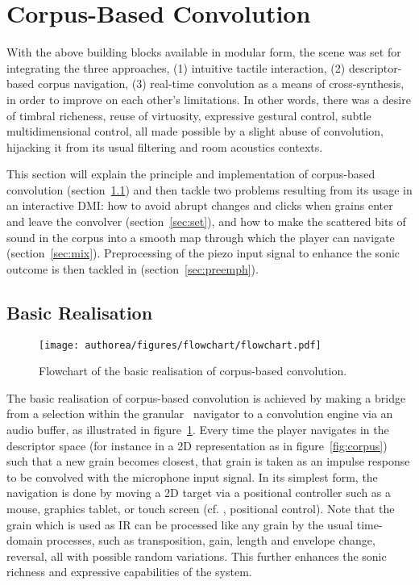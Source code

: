 \section{Corpus-Based Convolution} %

With the above building blocks available in modular form, the scene was set for integrating the three approaches, (1) intuitive tactile interaction, (2) descriptor-based corpus navigation, (3) real-time convolution as a means of cross-\hspace{0pt}synthesis, in order to improve on each other's limitations. In other words, there was a desire of timbral richeness, reuse of virtuosity, expressive gestural control, subtle multidimensional control, all made possible by a slight abuse of convolution, hijacking it from its usual filtering and room acoustics contexts.

This section will explain the principle and implementation of corpus-based convolution (section~\ref{sec:basic}) and then tackle two problems resulting from its usage in an interactive DMI: 
how to avoid abrupt changes and clicks when grains enter and leave the convolver (section~\ref{sec:set}), and
how to make the scattered bits of sound in the corpus into a smooth map through which the player can navigate (section~\ref{sec:mix}). Preprocessing of the piezo input signal to enhance the sonic outcome is then tackled in (section~\ref{sec:preemph}).

\subsection{Basic Realisation}\label{sec:basic}

\begin{figure}[tb] 
\texttt{[image: authorea/figures/flowchart/flowchart.pdf]} 
\caption{Flowchart of the basic realisation of corpus-based convolution.}
\label{fig:schema} 
\end{figure} 

The basic realisation of corpus-based convolution is achieved by making a bridge from a selection within the granular \cbcs\ navigator to a convolution engine via an audio buffer, as illustrated in figure~\ref{fig:schema}.  Every time the player navigates in the descriptor space (for instance in a 2D representation as in figure~\ref{fig:corpus}) such that a new grain becomes closest, that grain is taken as an impulse response to be convolved with the microphone input signal.  In its simplest form, the navigation is done by moving a 2D target via a positional controller such as a mouse, graphics tablet, or touch screen (cf. \cite{Schwarz-nime2012-sound-space}, positional control).
%
Note that the grain which is used as IR can be processed like any grain by the usual time-domain processes, such as transposition, gain, length and envelope change, reversal, all with possible random variations. This further enhances the sonic richness and expressive capabilities of the system.

